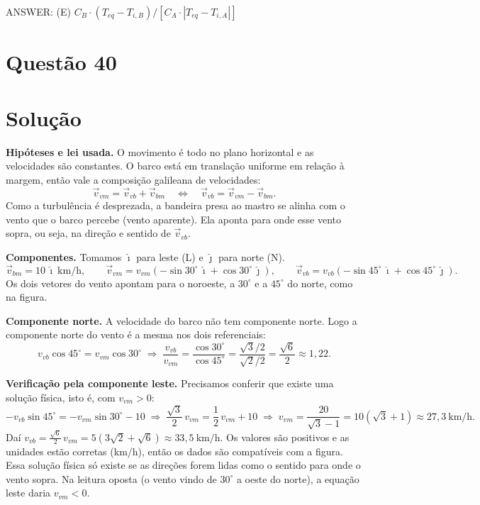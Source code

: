 \documentclass{article}%
\begin{document}
ANSWER: (E) $C_B\cdot(T_{eq}-T_{i,B})/[C_A\cdot|T_{eq}-T_{i,A}|]$%
\newpage%
\section*{Questão 40}

\section*{Solução}

\textbf{Hipóteses e lei usada.} O movimento é todo no plano horizontal e as velocidades são constantes. O barco está em translação uniforme em relação à margem, então vale a composição galileana de velocidades:
\[
\vec v_{vm}=\vec v_{vb}+\vec v_{bm}\quad\Longleftrightarrow\quad \vec v_{vb}=\vec v_{vm}-\vec v_{bm}.
\]
Como a turbulência é desprezada, a bandeira presa ao mastro se alinha com o vento que o barco percebe (vento aparente). Ela aponta para onde esse vento sopra, ou seja, na direção e sentido de $\vec v_{vb}$.

\textbf{Componentes.} Tomamos $\hat\imath$ para leste (L) e $\hat\jmath$ para norte (N).
\[
\vec v_{bm}=10\,\hat\imath\ \text{km/h},\qquad
\vec v_{vm}=v_{vm}\left(-\sin 30^\circ\,\hat\imath+\cos 30^\circ\,\hat\jmath\right),\qquad
\vec v_{vb}=v_{vb}\left(-\sin 45^\circ\,\hat\imath+\cos 45^\circ\,\hat\jmath\right).
\]
Os dois vetores do vento apontam para o noroeste, a $30^\circ$ e a $45^\circ$ do norte, como na figura.

\textbf{Componente norte.} A velocidade do barco não tem componente norte. Logo a componente norte do vento é a mesma nos dois referenciais:
\[
v_{vb}\cos 45^\circ=v_{vm}\cos 30^\circ
\;\Longrightarrow\;
\frac{v_{vb}}{v_{vm}}=\frac{\cos 30^\circ}{\cos 45^\circ}=\frac{\sqrt3/2}{\sqrt2/2}=\frac{\sqrt6}{2}\approx 1{,}22 .
\]

\textbf{Verificação pela componente leste.} Precisamos conferir que existe uma solução física, isto é, com $v_{vm}>0$:
\[
-v_{vb}\sin45^\circ=-v_{vm}\sin30^\circ-10
\;\Longrightarrow\;
\frac{\sqrt3}{2}\,v_{vm}=\frac12\,v_{vm}+10
\;\Longrightarrow\;
v_{vm}=\frac{20}{\sqrt3-1}=10\left(\sqrt3+1\right)\approx 27{,}3\ \text{km/h}.
\]
Daí $v_{vb}=\frac{\sqrt6}{2}\,v_{vm}=5\left(3\sqrt2+\sqrt6\right)\approx 33{,}5\ \text{km/h}$. Os valores são positivos e as unidades estão corretas (km/h), então os dados são compatíveis com a figura. Essa solução física só existe se as direções forem lidas como o sentido para onde o vento sopra. Na leitura oposta (o vento vindo de $30^\circ$ a oeste do norte), a equação leste daria $v_{vm}<0$.
\end{document}
